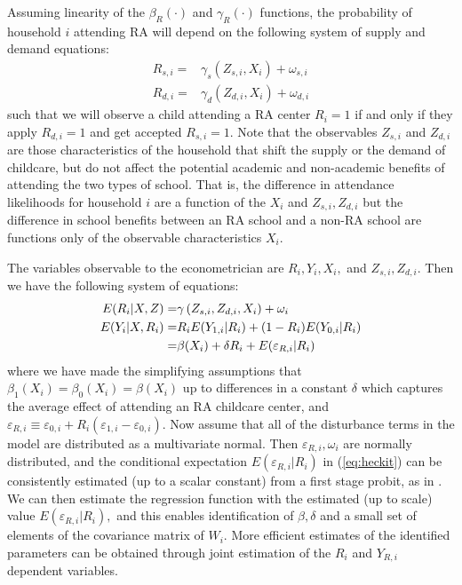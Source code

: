\documentclass[12pt]{article}
\begin{document}
Assuming linearity of the $\beta_{R}(\cdot)$ and $\gamma_{R}(\cdot)$
functions, the probability of household $i$ attending RA will depend on the
following system of supply and demand equations: 
\begin{align}
R_{s,i} = & \gamma_{s} \left( Z_{s,i}, X_{i} \right) + \omega_{s,i}
\label{eq:1stage-supply} \\
R_{d,i} = & \gamma_{d} \left( Z_{d,i}, X_{i} \right) + \omega_{d,i}
\label{eq:1stage-demand}
\end{align}
such that we will observe a child attending a RA center $R_{i}=1$ if and
only if they apply $R_{d,i}=1$ and get accepted $R_{s,i}=1$. Note that the
observables $Z_{s,i}$ and $Z_{d,i}$ are those characteristics of the
household that shift the supply or the demand of childcare, but do not
affect the potential academic and non-academic benefits of attending the two
types of school. That is, the difference in attendance likelihoods for
household $i$ are a function of the $X_{i}$ and $Z_{s,i},Z_{d,i}$ but the
difference in school benefits between an RA school and a non-RA school are
functions only of the observable characteristics $X_{i}$.

\bigskip

The variables observable to the econometrician are $R_{i},Y_{i},X_{i},$ and $%
Z_{s,i},Z_{d,i}$. Then we have the following system of equations:%
\begin{align}
E(R_{i}|X,Z) =& \gamma \left( Z_{s,i}, Z_{d,i}, X_{i} \right) + \omega_{i}
\label{eq:1stage} \\
E(Y_{i} |X,R_{i}) =& R_{i} E(Y_{1,i}| R_{i}) + (1-R_{i}) E(Y_{0,i}| R_{i}) 
\notag \\
=& \beta(X_{i}) + \delta R_{i} + E(\varepsilon_{R,i}| R_{i})
\label{eq:heckit}
\end{align}
where we have made the simplifying assumptions that $\beta_{1}(X_{i})=%
\beta_{0}(X_{i})=\beta(X_{i})$ up to differences in a constant $\delta$
which captures the average effect of attending an RA childcare center, and $%
\varepsilon_{R,i} \equiv \varepsilon_{0,i} +R_{i}
(\varepsilon_{1,i}-\varepsilon_{0,i})$. Now assume that all of the
disturbance terms in the model are distributed as a multivariate normal.
Then $\varepsilon_{R,i}, \omega_{i}$ are normally distributed, and the
conditional expectation $E(\varepsilon_{R,i}|R_{i})$ in (\ref{eq:heckit})
can be consistently estimated (up to a scalar constant) from a first stage
probit, as in \cite{Heckman1979}. We can then estimate the regression
function with the estimated (up to scale) value $E(\varepsilon_{R,i}|R_{i}),$
and this enables identification of $\beta,\delta$ and a small set of
elements of the covariance matrix of $W_{i}.$ More efficient estimates of
the identified parameters can be obtained through joint estimation of the $%
R_{i}$ and $Y_{R,i}$ dependent variables.
\end{document}
